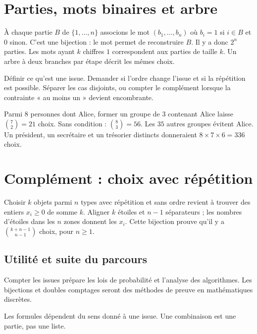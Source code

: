 \documentclass[../cours_tle.tex]{subfiles}
\begin{document}
\section{Parties, mots binaires et arbre}
À chaque partie $B$ de $\{1,\ldots,n\}$ associons le mot $(b_1,\ldots,b_n)$ où $b_i=1$ si $i\in B$ et $0$ sinon. C'est une bijection : le mot permet de reconstruire $B$.
Il y a donc $2^n$ parties. Les mots ayant $k$ chiffres $1$ correspondent aux parties de taille $k$.
Un arbre à deux branches par étape décrit les mêmes choix.

\begin{methode}
Définir ce qu'est une issue. Demander si l'ordre change l'issue et si la répétition est possible. Séparer les cas disjoints, ou compter le complément lorsque la contrainte « au moins un » devient encombrante.
\end{methode}
\begin{exemple}
Parmi $8$ personnes dont Alice, former un groupe de $3$ contenant Alice laisse $\binom72=21$ choix.
Sans condition : $\binom83=56$. Les $35$ autres groupes évitent Alice.
Un président, un secrétaire et un trésorier distincts donneraient $8\times7\times6=336$ choix.
\end{exemple}
\section{Complément : choix avec répétition}
Choisir $k$ objets parmi $n$ types avec répétition et sans ordre revient à trouver des entiers $x_i\ge0$ de somme $k$.
Aligner $k$ étoiles et $n-1$ séparateurs ; les nombres d'étoiles dans les $n$ zones donnent les $x_i$.
Cette bijection prouve qu'il y a $\binom{k+n-1}{n-1}$ choix, pour $n\ge1$.
\begin{finchapitre}
\section{Utilité et suite du parcours}
Compter les issues prépare les lois de probabilité et l'analyse des algorithmes. Les bijections et doubles comptages seront des méthodes de preuve en mathématiques discrètes.
\begin{retenir}
Les formules dépendent du sens donné à une issue. Une combinaison est une partie, pas une liste.
\end{retenir}
\end{finchapitre}
\end{document}
